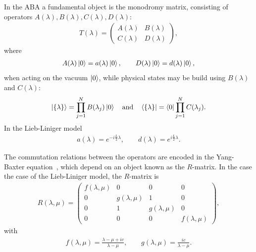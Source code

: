 \documentclass[11pt, a4paper]{report} %
\begin{document}
In the ABA a fundamental object is the monodromy matrix, consisting of operators \(A(\lambda), B(\lambda), C(\lambda), D(\lambda)\):
\begin{align}
  \label{eq:31}
  T(\lambda) =
  \begin{pmatrix}
    A(\lambda) & B(\lambda) \\
    C(\lambda) & D(\lambda)
  \end{pmatrix},
\end{align}
where 
\begin{align}
  \label{eq:36}
  A(\lambda) \ket{0} = a(\lambda)\ket{0},\qquad D(\lambda) \ket{0} = d(\lambda)\ket{0},
\end{align}
when acting on the vacuum \(\ket{0}\), while physical states may be build using \(B(\lambda)\) and \(C(\lambda)\):
\begin{align}
  \label{eq:42}
  \ket{\{\lambda\}} = \prod_{j=1}^{N} B(\lambda_j) \ket{0} \quad \mathrm{and} \quad \bra{\{\lambda\}} = \bra{0} \prod_{j=1}^N C(\lambda_j).
\end{align}
In the Lieb-Liniger model~\cite{Piroli2015}
\begin{align}
  \label{eq:43}
  a(\lambda) = e^{-i\frac{L}{2}\lambda}, \qquad d(\lambda) = e^{i\frac{L}{2}\lambda}.
\end{align}

The commutation relations between the operators are encoded in the Yang-Baxter equation~\cite{Korepin1993}, which depend on an object known as the \(R\)-matrix.
In the case the case of the Lieb-Liniger model, the \(R\)-matrix is
\begin{align}
  \label{eq:45}
  R(\lambda,\mu) = 
  \begin{pmatrix}
    f(\lambda, \mu) & 0 & 0 & 0\\
    0 & g(\lambda, \mu) & 1 & 0\\
    0 & 1 & g(\lambda, \mu) & 0 \\
    0 & 0 & 0 & f(\lambda,\mu)
  \end{pmatrix},
\end{align}
with
\begin{align}
  \label{eq:46}
  f(\lambda,\mu) = \frac{\lambda-\mu+ic}{\lambda-\mu}, \qquad g(\lambda,\mu) = \frac{ic}{\lambda-\mu}.
\end{align}
\end{document}
